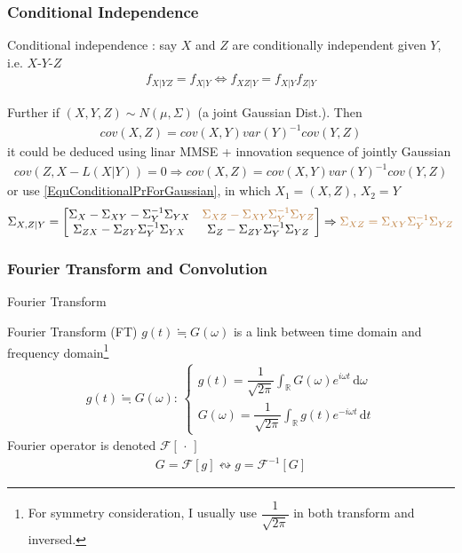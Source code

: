 \subsubsection{Conditional Independence}
Conditional independence : say $ X $ and $ Z $ are conditionally independent given $ Y $, i.e. $ X $-$ Y $-$ Z $
\begin{align}
    f_{X|YZ}=f_{X|Y}\Leftrightarrow f_{XZ|Y}=f_{X|Y}f_{Z|Y} 
\end{align}

Further if $ (X,Y,Z)\sim N(\mu ,\Sigma ) $ (a joint Gaussian Dist.). Then
\begin{align}
    cov(X,Z)=cov(X,Y)var(Y)^{-1}cov(Y,Z)
\end{align}
it could be deduced using linar MMSE + innovation sequence of jointly Gaussian
\begin{align}
    cov(Z,X-L(X|Y))=0\Rightarrow cov(X,Z)= cov(X,Y)var(Y)^{-1}cov(Y,Z)
\end{align}
or use \autoref{EquConditionalPrForGaussian}, in which $ X_1=(X,Z),\,X_2=Y $
\begin{align}
    \Sigma _{X,Z|Y}=\begin{bmatrix}
        \Sigma _{X}-\Sigma _{XY}-\Sigma _{Y}^{-1}\Sigma _{YX}&\color{brown}\Sigma _{XZ}-\Sigma _{XY}\Sigma _{Y}^{-1}\Sigma _{YZ}\\
        \Sigma _{ZX}-\Sigma _{ZY}\Sigma _Y^{-1}\Sigma _{YX}&\Sigma _{Z}-\Sigma _{ZY}\Sigma _Y^{-1}\Sigma _{YZ}
    \end{bmatrix} \Rightarrow {\color{brown}\Sigma _{XZ}=\Sigma _{XY}\Sigma _{Y}^{-1}\Sigma _{YZ}}
\end{align}



\subsubsection{Fourier Transform and Convolution}\label{SubSubSectionFourierAndConvolution}
\begin{point}
    Fourier Transform
\end{point}

Fourier Transform (FT) $ g(t)\fallingdotseq G(\omega ) $ is a link between time domain and frequency domain\footnote{For symmetry consideration, I usually use $ \dfrac{1}{\sqrt{2\pi}} $ in both transform and inversed.}
\begin{align}
     g(t)\fallingdotseq G(\omega ):\,\begin{cases}
        g(t)=\dfrac{1}{\sqrt{2\pi}}\int_\mathbb{R}G(\omega )e^{i\omega t}\,\mathrm{d}\omega \\
        G(\omega )=\dfrac{1}{\sqrt{2\pi}}\int _{\mathbb{R}}g(t)e^{-i\omega t} \,\mathrm{d}t
     \end{cases}
\end{align}
Fourier operator is denoted $ \mathscr{F}\left[ \, \cdot \,  \right] $
\begin{align}
    G=\mathscr{F}\left[ g \right] \leftrightsquigarrow g=\mathscr{F}^{-1}\left[ G \right] 
\end{align}

